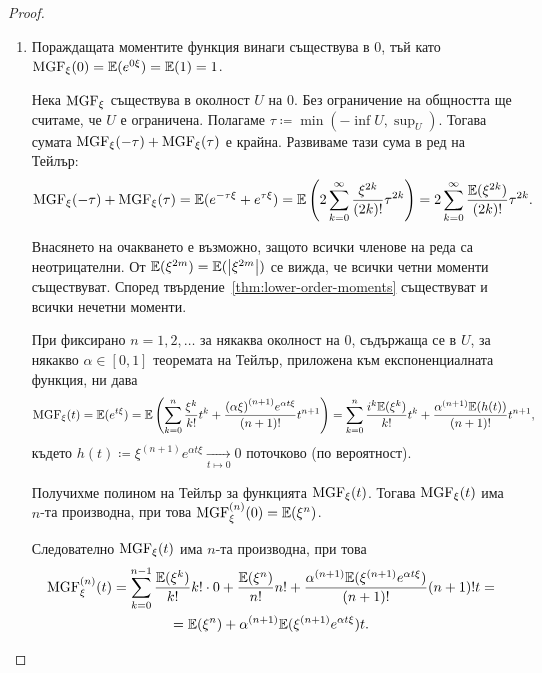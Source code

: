 \documentclass[numbers=endperiod, DIV=15, bibliography=totocnumbered]{scrartcl}
\begin{document}
\begin{proof}
  \mbox{}
  \begin{enumerate}
    \item Пораждащата моментите функция винаги съществува в $0$, тъй като $\operatorname{MGF}_\xi(0) = \mathbb{E}(e^{0\xi}) = \mathbb{E}(1) = 1$.

    Нека $\operatorname{MGF}_\xi$ съществува в околност $U$ на $0$. Без ограничение на общността ще считаме, че $U$ е ограничена. Полагаме $\tau \coloneqq \min(-\inf U, \sup_U)$. Тогава сумата $\operatorname{MGF}_\xi(-\tau) + \operatorname{MGF}_\xi(\tau)$ е крайна. Развиваме тази сума в ред на Тейлър:
    \begin{displaymath}
      \operatorname{MGF}_\xi(-\tau) + \operatorname{MGF}_\xi(\tau)
      =
      \mathbb{E}(e^{-\tau\xi} + e^{\tau\xi})
      =
      \mathbb{E}\left( 2 \sum_{k=0}^\infty \frac {\xi^{2k}} {(2k)!} \tau^{2k} \right)
      =
      2 \sum_{k=0}^\infty \frac {\mathbb{E}(\xi^{2k})} {(2k)!} \tau^{2k}.
    \end{displaymath}

    Внасянето на очакването е възможно, защото всички членове на реда са неотрицателни. От $\mathbb{E}(\xi^{2m}) = \mathbb{E}(\left\vert \xi^{2m} \right\vert)$ се вижда, че всички четни моменти съществуват. Според твърдение~\ref{thm:lower-order-moments} съществуват и всички нечетни моменти.

    При фиксирано $n = 1, 2, \ldots$ за някаква околност на $0$, съдържаща се в $U$, за някакво $\alpha \in [0, 1]$ теоремата на Тейлър, приложена към експоненциалната функция, ни дава
    \begin{displaymath}
      \operatorname{MGF}_\xi(t)
      =
      \mathbb{E}(e^{t\xi})
      =
      \mathbb{E}\left(\sum_{k=0}^n \frac {\xi^k} {k!} t^k + \frac {{(\alpha \xi)}^{(n+1)} e^{\alpha t \xi}} {(n+1)!} t^{n+1} \right)
      =
      \sum_{k=0}^n \frac {i^k \mathbb{E}(\xi^k)} {k!} t^k + \frac {{\alpha}^{(n+1)} \mathbb{E}(h(t))} {(n+1)!} t^{n+1},
    \end{displaymath}
    където $h(t) \coloneqq \xi^{(n+1)} e^{\alpha t \xi} \underset {t \mapsto 0} \longrightarrow 0$ поточково (по вероятност).

    Получихме полином на Тейлър за функцията $\operatorname{MGF}_\xi(t)$. Тогава $\operatorname{MGF}_\xi(t)$ има $n$-та производна, при това $\operatorname{MGF}^{(n)}_\xi(0) = \mathbb{E}(\xi^n)$.

    Следователно $\operatorname{MGF}_\xi(t)$ има $n$-та производна, при това
    \begin{multline*}
      \operatorname{MGF}^{(n)}_\xi(t)
      =
      \sum_{k=0}^{n-1} \frac {\mathbb{E}(\xi^k)} {k!} k! \cdot 0 + \frac {\mathbb{E}(\xi^n)} {n!} n! + \frac {\alpha^{(n+1)} \mathbb{E}(\xi^{(n+1)} e^{\alpha t \xi})} {(n+1)!} (n+1)! t
      = \\ =
      \mathbb{E}(\xi^n) + \alpha^{(n+1)} \mathbb{E}(\xi^{(n+1)} e^{\alpha t \xi}) t.
    \end{multline*}


\end{enumerate}
\end{proof}
\end{document}
